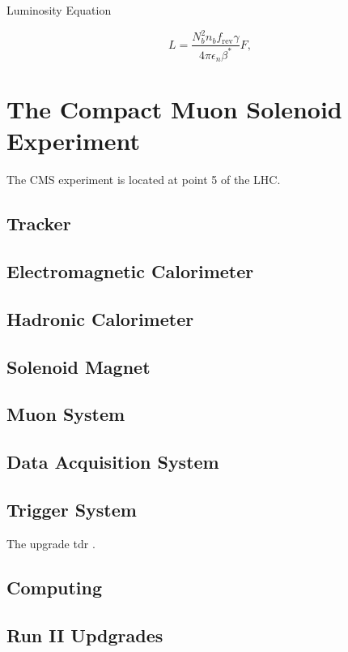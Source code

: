 Luminosity Equation

\begin{equation}
L=\frac{N_{b}^{2}n_{b}f_{\text{rev}}\gamma}{4\pi\epsilon_{n}\beta^{*}}F,
\end{equation}

\section{The Compact Muon Solenoid Experiment}
\label{SECTION:ExperimentalApparatus_CMS}

The \gls{CMS} experiment is located at point 5 of the \gls{LHC}.





\subsection{Tracker}
\label{SUBSECTION:ExperimentalApparatus_CMS_Tracker}

\subsection{Electromagnetic Calorimeter}
\label{SUBSECTION:ExperimentalApparatus_CMS_ECAL}

\subsection{Hadronic Calorimeter}
\label{SUBSECTION:ExperimentalApparatus_CMS_HCAL}

\subsection{Solenoid Magnet}
\label{SUBSECTION:ExperimentalApparatus_CMS_Magnet}

\subsection{Muon System}
\label{SUBSECTION:ExperimentalApparatus_CMS_Mouns}

\subsection{Data Acquisition System}
\label{SUBSECTION:ExperimentalApparatus_CMS_DAQ}

\subsection{Trigger System}
\label{SUBSECTION:ExperimentalApparatus_CMS_Trigger}

The upgrade tdr \cite{CMSL1UpgradeTDR}.

\subsection{Computing}
\label{SUBSECTION:ExperimentalApparatus_CMS_Computing}


\subsection{Run II Updgrades}
\label{SUBSECTION:ExperimentalApparatus_CMS_RUNII}

